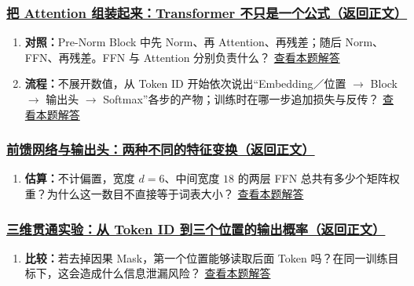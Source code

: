 \subsubsection*{\hyperref[check:22-transformer-architecture]{把 Attention 组装起来：Transformer 不只是一个公式（返回正文）}}\begin{enumerate}[label={},leftmargin=4.8em,itemsep=4pt]
\item[\textbf{C4-24.}] \label{exercise:C4-24}\label{extension:22-transformer-architecture:4}\textbf{对照：}Pre-Norm Block 中先 Norm、再 Attention、再残差；随后 Norm、FFN、再残差。FFN 与 Attention 分别负责什么？ \hyperref[answerpiece:22-transformer-architecture:4]{查看本题解答}
\item[\textbf{C4-25.}] \label{exercise:C4-25}\label{extension:22-transformer-architecture:5}\textbf{流程：}不展开数值，从 Token ID 开始依次说出“Embedding／位置 $\to$ Block $\to$ 输出头 $\to$ Softmax”各步的产物；训练时在哪一步追加损失与反传？ \hyperref[answerpiece:22-transformer-architecture:5]{查看本题解答}
\end{enumerate}

\subsubsection*{\hyperref[check:10b-ffn-output-head]{前馈网络与输出头：两种不同的特征变换（返回正文）}}\begin{enumerate}[label={},leftmargin=4.8em,itemsep=4pt]
\item[\textbf{C4-26.}] \label{exercise:C4-26}\label{extension:10b-ffn-output-head:4}\textbf{估算：}不计偏置，宽度 $d=6$、中间宽度 $18$ 的两层 FFN 总共有多少个矩阵权重？为什么这一数目不直接等于词表大小？ \hyperref[answerpiece:10b-ffn-output-head:4]{查看本题解答}
\end{enumerate}

\subsubsection*{\hyperref[check:22b-token-to-output]{三维贯通实验：从 Token ID 到三个位置的输出概率（返回正文）}}\begin{enumerate}[label={},leftmargin=4.8em,itemsep=4pt]
\item[\textbf{C4-27.}] \label{exercise:C4-27}\label{extension:22b-token-to-output:4}\textbf{比较：}若去掉因果 Mask，第一个位置能够读取后面 Token 吗？在同一训练目标下，这会造成什么信息泄漏风险？ \hyperref[answerpiece:22b-token-to-output:4]{查看本题解答}
\end{enumerate}

